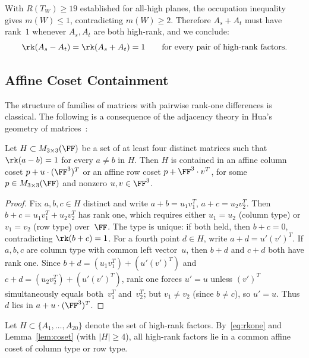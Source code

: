 \documentclass[11pt,a4paper]{article}
\begin{document}
\medskip

With $R(T_W)\ge19$ established for all-high planes, the occupation inequality gives $m(W)\le1$, contradicting $m(W)\ge2$. Therefore $A_s+A_t$ must have rank~$1$ whenever $A_s,A_t$ are both high-rank, and we conclude:
\begin{equation}\label{eq:rkone}
  \rk(A_s-A_t) = \rk(A_s+A_t) = 1 \qquad\text{for every pair of high-rank factors}.
\end{equation}

\subsection{Affine Coset Containment}\label{sec:coset}

The structure of families of matrices with pairwise rank-one differences is classical.  The following is a consequence of the adjacency theory in Hua's geometry of matrices~\cite{hua1945geometries,wan1996geometry,pazzis2015hua}:

\begin{lemma}\label{lem:coset}
  Let $H\subset M_{3\times 3}(\FF)$ be a set of at least four distinct matrices such that $\rk(a-b)=1$ for every $a\ne b$ in $H$.  Then $H$ is contained in an affine column coset $p+u\cdot(\FF^3)^T$ or an affine row coset $p+\FF^3\cdot v^T$, for some $p\in M_{3\times 3}(\FF)$ and nonzero $u,v\in\FF^3$.
\end{lemma}

\begin{proof}
  Fix $a,b,c\in H$ distinct and write $a+b=u_1v_1^T$, $a+c=u_2v_2^T$.  Then $b+c=u_1v_1^T+u_2v_2^T$ has rank one, which requires either $u_1=u_2$ (column type) or $v_1=v_2$ (row type) over~$\FF$.  The type is unique: if both held, then $b+c=0$, contradicting $\rk(b+c)=1$.  For a fourth point $d\in H$, write $a+d=u'(v')^T$.  If $a,b,c$ are column type with common left vector~$u$, then $b+d$ and $c+d$ both have rank one.  Since $b+d=(u_1v_1^T)+(u'(v')^T)$ and $c+d=(u_2v_2^T)+(u'(v')^T)$, rank one forces $u'=u$ unless $(v')^T$ simultaneously equals both~$v_1^T$ and~$v_2^T$; but $v_1\ne v_2$ (since $b\ne c$), so $u'=u$.  Thus $d$ lies in $a+u\cdot(\FF^3)^T$.
\end{proof}

Let $H\subset\{A_1,\ldots,A_{20}\}$ denote the set of high-rank factors.  By~\eqref{eq:rkone} and Lemma~\ref{lem:coset} (with $|H|\ge 4$), all high-rank factors lie in a common affine coset of column type or row type.
\end{document}
